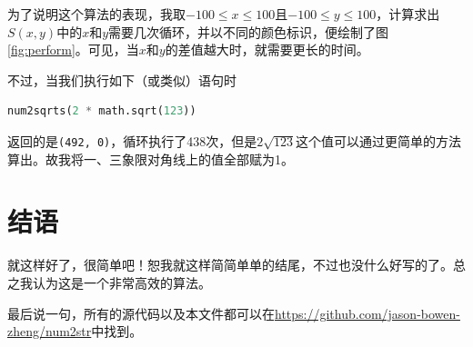 \documentclass[a4paper, UTF8]{ctexart}
\begin{document}
为了说明这个算法的表现，我取$-100\leq x\leq100$且$-100\leq y\leq100$，计算求出$S(x,y)$中的$x$和$y$需要几次循环，并以不同的颜色标识，便绘制了图\ref{fig:perform}。可见，当$x$和$y$的差值越大时，就需要更长的时间。

不过，当我们执行如下（或类似）语句时
\begin{lstlisting}[language=python]
num2sqrts(2 * math.sqrt(123))
\end{lstlisting}
返回的是\verb|(492, 0)|，循环执行了438次，但是$2\sqrt{123}$这个值可以通过更简单的方法算出。故我将一、三象限对角线上的值全部赋为1。

\section{结语}
就这样好了，很简单吧！恕我就这样简简单单的结尾，不过也没什么好写的了。总之我认为这是一个非常高效的算法。

最后说一句，所有的源代码以及本文件都可以在\url{https://github.com/jason-bowen-zheng/num2str}中找到。
\end{document}
